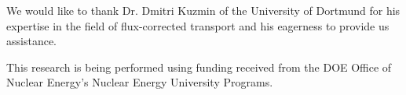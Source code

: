 We would like to thank Dr. Dmitri Kuzmin of the University of Dortmund
for his expertise in the field
of flux-corrected transport and his eagerness to provide us assistance.

This research is being performed using funding received from the DOE
Office of Nuclear Energy's Nuclear Energy University Programs.

